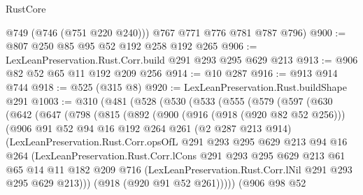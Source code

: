 \begin{lexlean}{RustCore}
\begin{coremodule}
        @749
        (@746 (@751 @220 @240)))
      @767
      @771
      @776
      @781
      @787
      @796)
@900 := @807 @250 @85 @95 @52 @192 @258 @192 @265
@906 := LexLeanPreservation.Rust.Corr.build @291 @293 @295 @629 @213
@913 := @906 @82 @52 @65 @11 @192 @209 @256
@914 := @10 @287
@916 := @913 @914 @744
@918 := @525 (@315 @8)
@920 := LexLeanPreservation.Rust.buildShape @291
@1003 := @310
    (@481
      (@528
        (@530
          (@533
            (@555
              (@579
                (@597
                  (@630
                    (@642
                      (@647
                        (@798
                          (@815
                            (@892
                              (@900
                                (@916 (@918 (@920 @82 @52 @256)))
                                (@906
                                  @91
                                  @52
                                  @94
                                  @16
                                  @192
                                  @264
                                  @261
                                  (@2 @287 @213 @914)
                                  (LexLeanPreservation.Rust.Corr.opsOfL
                                    @291
                                    @293
                                    @295
                                    @629
                                    @213
                                    @94
                                    @16
                                    @264
                                    (LexLeanPreservation.Rust.Corr.lCons
                                      @291
                                      @293
                                      @295
                                      @629
                                      @213
                                      @61
                                      @65
                                      @14
                                      @11
                                      @182
                                      @209
                                      @716
                                      (LexLeanPreservation.Rust.Corr.lNil
                                        @291
                                        @293
                                        @295
                                        @629
                                        @213)))
                                  (@918 (@920 @91 @52 @261)))))
                            (@906
                              @98
                              @52

\end{coremodule}
\end{lexlean}
